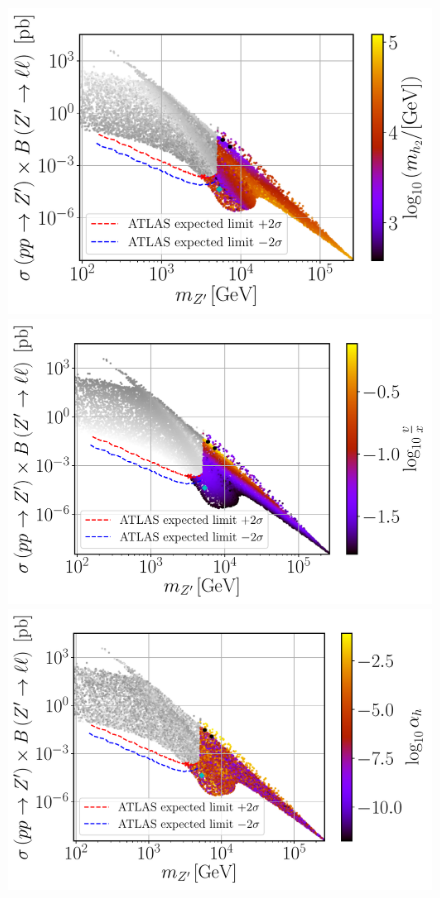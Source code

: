 \documentclass[a4paper,11pt]{article}
\renewcommand{\(}{\left(}
\renewcommand{\)}{\right)}
\renewcommand{\[}{\left[}
\renewcommand{\]}{\right]}
\begin{document}
\begin{figure}[!htb]
	\centering
	\includegraphics[scale=0.37]{mZp_Xsec_mh2.pdf}
	\includegraphics[scale=0.37]{mZp_Xsec_VEV.pdf}
	\includegraphics[scale=0.37]{mZp_Xsec_alpha.pdf}	

\end{figure}
\end{document}
